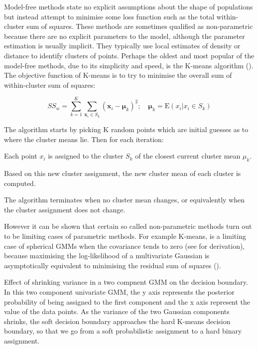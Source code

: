 Model-free methods state no explicit assumptions about the shape of populations but instead
attempt to minimise some loss function such as the total within-cluster sum of squares.
These methods are sometimes qualified as non-parametric because there are no explicit parameters to the model,
although the parameter estimation is usually implicit.
They typically use local estimates of density or distance to identify clusters of points.
Perhaps the oldest and most popular of the model-free methods, due to its simplicity and speed, is the K-means algorithm (\citep{MacQueen:1967uv}).
The objective function of K-means is to try to minimise the overall sum of within-cluster sum of squares:

\[
SS_{w} = \sum_{k=1}^{K} \sum_{\mathbf x_i \in S_k} ( \mathbf x_i - \boldsymbol\mu_k )^2 ; \quad \boldsymbol\mu_k=\text{E}(x_i| x_i \in S_k)
\]

The algorithm starts by picking K random points which are initial guesses as to where the cluster means lie.
Then for each iteration:
\begin{itemise}
    \item Each point $x_i$ is assigned to the cluster $S_k$ of the closest current cluster mean $\mu_k$.
    \item Based on this new cluster assignment, the new cluster mean of each cluster is computed.
\end{itemise}
The algorithm terminates when no cluster mean changes, or equivalently when the cluster assignment does not change.

However it can be shown that certain so called non-parametric methods turn out to be limiting cases of parametric methods.
For example K-means, is a limiting case of spherical \glspl{GMM} when the covariance tends to zero (see  for derivation),
because maximising the log-likelihood of a multivariate Gaussian is asymptotically equivalent to minimising the residual sum of squares ().

{ Effect of shrinking variance in a two compnent \gls{GMM} on the decision boundary. }
{
  In this two component univariate \gls{GMM}, the y axis represents the posterior probability of being assigned to the first component and
  the x axis represent the value of the data points.
  As the variance of the two Gaussian components shrinks, the soft decision boundary approaches the hard K-means decision boundary, so that we go from
  a soft probabilistic assignment to a hard binary assignment. 
}


